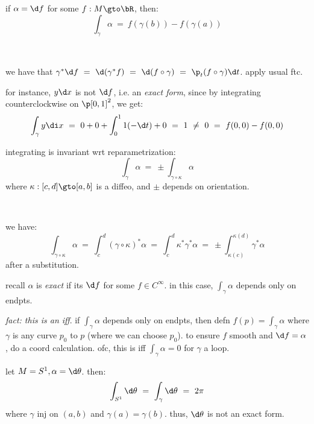 \begin{prop}
	if $\alpha=\d f$ for some $f:M\gto\bR$, then:
	\begin{equation*}
		\int_{\gamma}\alpha \ = \ f(\gamma(b))-f(\gamma(a))
	\end{equation*}
\end{prop} \

\begin{pf}
	we have that
	$\gamma^{*}\d f \ = \ \d(\gamma^{*}f) \ = \ \d(f\circ\gamma) \ = \ \p_{t}(f\circ\gamma)\d t$.
	apply usual ftc.
\end{pf}

for instance, $y\d x$ is not $\d f$, i.e. an \textit{exact form}, since
by integrating counterclockwise on $\p[0,1]^{2}$, we get:
\begin{equation*}
	\int_{\gamma}y\di x \ = \ 0+0+\int_{0}^{1}1(-\d t) + 0 \ = \ 1 \ \neq \ 0 \ = \ f(0,0)-f(0,0)
\end{equation*}

\begin{prop}
	integrating is invariant wrt reparametrization:
	\begin{equation*}
		\int_{\gamma}\alpha \ = \ \pm\int_{\gamma\circ\kappa}\alpha
	\end{equation*}
	where $\kappa:[c,d]\gto[a,b]$ is a diffeo, and $\pm$ depends on orientation.
\end{prop} \

\begin{pf}
	we have:
	\begin{equation*}
		\int_{\gamma\circ\kappa}\alpha \ = \ \int_{c}^{d}(\gamma\circ\kappa)^{*}\alpha
		\ = \ \int_{c}^{d}\kappa^{*}\gamma^{*}\alpha \ = \ \pm \int_{\kappa(c)}^{\kappa(d)}\gamma^{*}\alpha
	\end{equation*}
	after a substitution.
\end{pf}

recall $\alpha$ is \textit{exact} if its $\d f$ for some $f\in C^{\infty}$.
in this case, $\int_{\gamma}\alpha$ depends only on endpts.

\textit{fact: this is an iff}.
if $\int_{\gamma}\alpha$ depends only on endpts, then defn $f(p)=\int_{\gamma}\alpha$ where
$\gamma$ is any curve $p_{0}$ to $p$ (where we can choose $p_{0}$).
to ensure $f$ smooth and $\d f=\alpha$, do a coord calculation.
ofc, this is iff $\int_{\gamma}\alpha=0$ for $\gamma$ a loop.

\begin{xmp}
	let $M=S^{1},\alpha=\d\theta$. then:
	\begin{equation*}
		\int_{S^{1}}\d\theta \ = \ \int_{\gamma}\d\theta \ = \ 2\pi
	\end{equation*}
	where $\gamma$ inj on $(a,b)$ and $\gamma(a)=\gamma(b)$.
	thus, $\d\theta$ is not an exact form.
\end{xmp}

